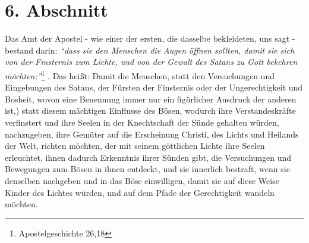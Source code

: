 \section{6. Abschnitt}  \label{kap2_ab6}

Das Amt der Apostel - wie einer der ersten, die dasselbe bekleideten, uns sagt -
bestand darin:
\textit{"`dass sie den Menschen die Augen öffnen sollten, damit sie
sich von der Finsternis zum Lichte, und von der Gewalt des Satans zu Gott
bekehren
möchten;"'}\footnote{Apostelgeschichte 26,18}
.
Das heißt: Damit die Menschen, statt den
Versuchungen und Eingebungen des Satans,  der Fürsten der
Finsternis oder der Ungerechtigkeit und Bosheit, wovon eine Benennung immer nur
ein figürlicher Ausdruck der anderen ist,) statt diesem mächtigen Einflusse des
Bösen, wodurch ihre Verstandeskräfte verfinstert und ihre Seelen in der
Knechtschaft der Sünde gehalten würden, nachzugeben, ihre Gemüter auf die
Erscheinung Christi, des Lichts und Heilands der Welt, richten möchten, der
mit seinem göttlichen Lichte ihre Seelen erleuchtet, ihnen dadurch Erkenntnis
ihrer Sünden gibt, die Versuchungen und Bewegungen zum Bösen in ihnen entdeckt,
und sie innerlich bestraft, wenn sie denselben nachgeben und in das Böse
einwilligen, damit sie auf diese Weise Kinder des Lichtes würden, und auf dem
Pfade der Gerechtigkeit wandeln möchten.

\medskip

